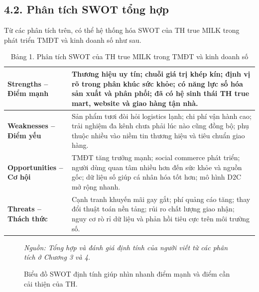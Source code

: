 \subsection*{4.2. Phân tích SWOT tổng hợp}
Từ các phân tích trên, có thể hệ thống hóa SWOT của TH true MILK trong phát triển TMĐT và kinh doanh số như sau.

\begin{table}[htbp]
\centering
\renewcommand{\arraystretch}{1.35}
\begin{tabular}{>{\raggedright\arraybackslash}p{} p{}}
\toprule
\textbf{Strengths -- Điểm mạnh} & Thương hiệu uy tín; chuỗi giá trị khép kín; định vị rõ trong phân khúc sức khỏe; có năng lực số hóa sản xuất và phân phối; đã có hệ sinh thái TH true mart, website và giao hàng tận nhà. \\
\midrule
\textbf{Weaknesses -- Điểm yếu} & Sản phẩm tươi đòi hỏi logistics lạnh; chi phí vận hành cao; trải nghiệm đa kênh chưa phải lúc nào cũng đồng bộ; phụ thuộc nhiều vào niềm tin thương hiệu và tiêu chuẩn giao hàng. \\
\midrule
\textbf{Opportunities -- Cơ hội} & TMĐT tăng trưởng mạnh; social commerce phát triển; người dùng quan tâm nhiều hơn đến sức khỏe và nguồn gốc; dữ liệu số giúp cá nhân hóa tốt hơn; mô hình D2C mở rộng nhanh. \\
\midrule
\textbf{Threats -- Thách thức} & Cạnh tranh khuyến mãi gay gắt; phí quảng cáo tăng; thay đổi thuật toán nền tảng; rủi ro chất lượng giao nhận; nguy cơ rò rỉ dữ liệu và phản hồi tiêu cực trên môi trường số. \\
\bottomrule
\end{tabular}
\caption{Bảng 1. Phân tích SWOT của TH true MILK trong TMĐT và kinh doanh số}
\end{table}

\begin{figure}[htbp]
\centering
{}

\vspace{0.1cm}
{\small \textit{Nguồn: Tổng hợp và đánh giá định tính của người viết từ các phân tích ở Chương 3 và 4.}}
\caption{Biểu đồ SWOT định tính giúp nhìn nhanh điểm mạnh và điểm cần cải thiện của TH.}
\end{figure}

